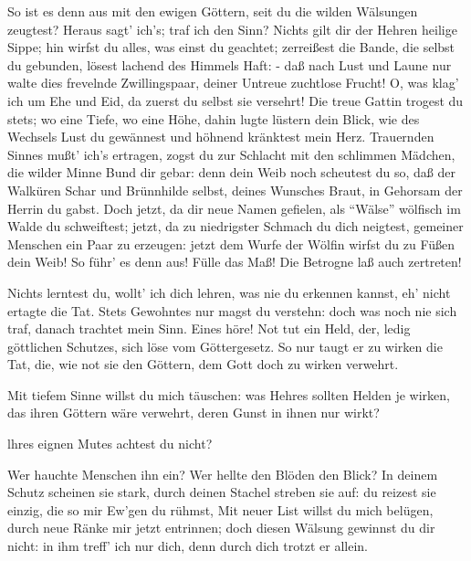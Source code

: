 \begin{drama}

So ist es denn aus mit den ewigen Göttern,
seit du die wilden Wälsungen zeugtest?
Heraus sagt' ich's; traf ich den Sinn?
Nichts gilt dir der Hehren heilige Sippe;
hin wirfst du alles, was einst du geachtet;
zerreißest die Bande, die selbst du gebunden,
lösest lachend des Himmels Haft: -
daß nach Lust und Laune nur walte
dies frevelnde Zwillingspaar,
deiner Untreue zuchtlose Frucht!
O, was klag' ich um Ehe und Eid,
da zuerst du selbst sie versehrt!
Die treue Gattin trogest du stets;
wo eine Tiefe, wo eine Höhe,
dahin lugte lüstern dein Blick,
wie des Wechsels Lust du gewännest
und höhnend kränktest mein Herz.
Trauernden Sinnes mußt' ich's ertragen,
zogst du zur Schlacht mit den schlimmen Mädchen,
die wilder Minne Bund dir gebar:
denn dein Weib noch scheutest du so,
daß der Walküren Schar
und Brünnhilde selbst, deines Wunsches Braut,
in Gehorsam der Herrin du gabst.
Doch jetzt, da dir neue
Namen gefielen,
als ``Wälse'' wölfisch im Walde du schweiftest;
jetzt, da zu niedrigster
Schmach du dich neigtest,
gemeiner Menschen ein Paar zu erzeugen:
jetzt dem Wurfe der Wölfin
wirfst du zu Füßen dein Weib!
So führ' es denn aus! Fülle das Maß!
Die Betrogne laß auch zertreten!
 

\Wotanspeaks


Nichts lerntest du, wollt' ich dich lehren,
was nie du erkennen kannst,
eh' nicht ertagte die Tat.
Stets Gewohntes nur magst du verstehn:
doch was noch nie sich traf,
danach trachtet mein Sinn.
Eines höre! Not tut ein Held,
der, ledig göttlichen Schutzes,
sich löse vom Göttergesetz.
So nur taugt er zu wirken die Tat,
die, wie not sie den Göttern,
dem Gott doch zu wirken verwehrt.
 

\Frickaspeaks
Mit tiefem Sinne willst du mich täuschen:
was Hehres sollten Helden je wirken,
das ihren Göttern wäre verwehrt,
deren Gunst in ihnen nur wirkt?
 

\Wotanspeaks
lhres eignen Mutes achtest du nicht?
 

\Frickaspeaks
Wer hauchte Menschen ihn ein?
Wer hellte den Blöden den Blick?
In deinem Schutz scheinen sie stark,
durch deinen Stachel streben sie auf:
du reizest sie einzig,
die so mir Ew'gen du rühmst,
Mit neuer List willst du mich belügen,
durch neue Ränke
mir jetzt entrinnen;
doch diesen Wälsung gewinnst du dir nicht:
in ihm treff' ich nur dich,
denn durch dich trotzt er allein.
 

\Wotanspeaks


\end{drama}

